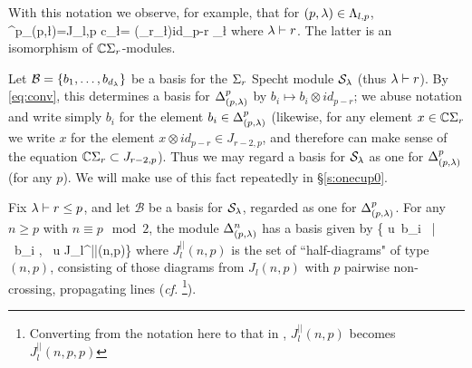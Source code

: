 With this notation we observe, for example, that for $(p,\lambda)\in \Lambda_{l,p}$, 
\beq
\Deltaa^{p}_{(p,\l)}=J_{l,p} c_\l= (\C\Sigma_{r}\nC_\l)\otimes id_{p-r} 
    \SS_\l
\label{eq:conv}\eq
where $\lambda\vdash r$. 
The latter is an isomorphism of $\mathbb{C} \Sigma_r$-modules.

\mdef \label{pa:spbasis}
Let $\mathcal{B}=\{b_1,\dots,b_{d_\lambda}\}$ be a basis for the $\Sigma_r$ Specht module $\mathcal{S}_\lambda$ (thus $\lambda\vdash r$). By \eqref{eq:conv}, this determines a basis for $\Delta^p_{(p,\lambda)}$ by $b_i\mapsto b_i \otimes id_{p-r}$; we abuse notation and write simply $b_i$ for the element $b_i\in \Delta^p_{(p,\lambda)}$ (likewise, for any element $x\in \mathbb{C} \Sigma_r$ we write $x$ for the element $x\otimes id_{p-r} \in J_{r-2, p}$, and therefore can make sense of the equation $\mathbb{C} \Sigma_{r}\subset J_{r-2,p}$). Thus we may regard a basis for $\mathcal{S}_\lambda$ as one for $\Delta^p_{(p,\lambda)}$ (for any $p$). We will make use of this fact repeatedly in \S\ref{s:onecup0}. 

\mdef \label{pa:diagbas}  Fix $\lambda \vdash r\leq p$, and let $\mathcal{B}$ be a basis for $\mathcal{S}_\lambda$, regarded as one for $\Delta^p_{(p,\lambda)}$. For any $n\geq p$ with $n\equiv p\mod 2$,  the module $\Delta^{n}_{(p,\lambda)}$ has a basis given by
\beq
\{ u\, b_i \ | \ b_i \in {}, \ u \in J_l^{||}(n,p)\}\label{eq:diagbas}
\eq
where $J_l^{||}(n,p)$ is the set of ``half-diagrams" of type $(n,p)$, consisting of those diagrams from $J_l(n,p)$ with $p$ pairwise non-crossing, propagating lines (\textit{cf.} \cite[4.7]{KadarYu} \footnote{Converting from the notation here to that in \cite{KadarYu}, $J^{||}_l(n,p)$ becomes $J_l^{||}(n,p,p)$}).  
\medskip 




